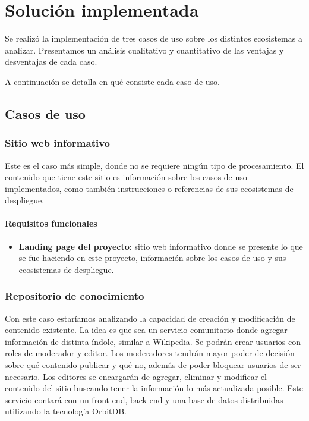 \section{Solución implementada}

Se realizó la implementación de tres casos de uso sobre los distintos ecosistemas a analizar. Presentamos un análisis cualitativo y cuantitativo de las ventajas y desventajas de cada caso.

A continuación se detalla en qué consiste cada caso de uso.

\subsection{Casos de uso}

\subsubsection{Sitio web informativo}

Este es el caso más simple, donde no se requiere ningún tipo de procesamiento. El contenido que tiene este sitio es información sobre los casos de uso implementados, como también instrucciones o referencias de sus ecosistemas de despliegue.

\paragraph{Requisitos funcionales}

\begin{itemize}
    \item \textbf{Landing page del proyecto}: sitio web informativo donde se presente lo que se fue haciendo en este proyecto, información sobre los casos de uso y sus ecosistemas de despliegue.
\end{itemize}

\subsubsection{Repositorio de conocimiento}

Con este caso estaríamos analizando la capacidad de creación y modificación de contenido existente. La idea es que sea un servicio comunitario donde agregar información de distinta índole, similar a Wikipedia. Se podrán crear usuarios con roles de moderador y editor. Los moderadores tendrán mayor poder de decisión sobre qué contenido publicar y qué no, además de poder bloquear usuarios de ser necesario. Los editores se encargarán de agregar, eliminar y modificar el contenido del sitio buscando tener la información lo más actualizada posible. Este servicio contará con un front end, back end y una base de datos distribuidas utilizando la tecnología OrbitDB.

